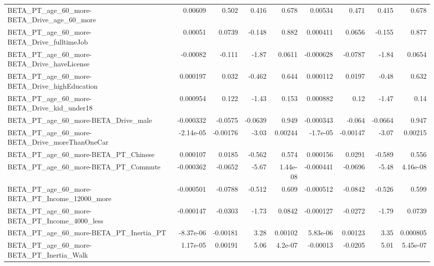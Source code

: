 \begin{tabular}{lrrrrrrrr}
BETA\_PT\_age\_60\_more-BETA\_Drive\_age\_60\_more         &     0.00609 &        0.502 &    0.416 &    0.678 &    0.00534 &       0.471 &        0.415 &         0.678 \\
BETA\_PT\_age\_60\_more-BETA\_Drive\_fulltimeJob         &     0.00051 &       0.0739 &   -0.148 &    0.882 &   0.000411 &      0.0656 &       -0.155 &         0.877 \\
BETA\_PT\_age\_60\_more-BETA\_Drive\_haveLicense         &    -0.00082 &       -0.111 &    -1.87 &   0.0611 &  -0.000628 &     -0.0787 &        -1.84 &        0.0654 \\
BETA\_PT\_age\_60\_more-BETA\_Drive\_highEducation       &    0.000197 &        0.032 &   -0.462 &    0.644 &   0.000112 &      0.0197 &        -0.48 &         0.632 \\
BETA\_PT\_age\_60\_more-BETA\_Drive\_kid\_under18         &    0.000954 &        0.122 &    -1.43 &    0.153 &   0.000882 &        0.12 &        -1.47 &          0.14 \\
BETA\_PT\_age\_60\_more-BETA\_Drive\_male                &   -0.000332 &      -0.0575 &  -0.0639 &    0.949 &  -0.000343 &      -0.064 &      -0.0664 &         0.947 \\
BETA\_PT\_age\_60\_more-BETA\_Drive\_moreThanOneCar      &   -2.14e-05 &     -0.00176 &    -3.03 &  0.00244 &   -1.7e-05 &    -0.00147 &        -3.07 &       0.00215 \\
BETA\_PT\_age\_60\_more-BETA\_PT\_Chinese                &    0.000107 &       0.0185 &   -0.562 &    0.574 &   0.000156 &      0.0291 &       -0.589 &         0.556 \\
BETA\_PT\_age\_60\_more-BETA\_PT\_Commute                &   -0.000362 &      -0.0652 &    -5.67 & 1.44e-08 &  -0.000441 &     -0.0696 &        -5.48 &      4.16e-08 \\
BETA\_PT\_age\_60\_more-BETA\_PT\_Income\_12000\_more      &   -0.000501 &      -0.0788 &   -0.512 &    0.609 &  -0.000512 &     -0.0842 &       -0.526 &         0.599 \\
BETA\_PT\_age\_60\_more-BETA\_PT\_Income\_4000\_less       &   -0.000147 &      -0.0303 &    -1.73 &   0.0842 &  -0.000127 &     -0.0272 &        -1.79 &        0.0739 \\
BETA\_PT\_age\_60\_more-BETA\_PT\_Inertia\_PT             &   -8.37e-06 &     -0.00181 &     3.28 &  0.00102 &   5.83e-06 &     0.00123 &         3.35 &      0.000805 \\
BETA\_PT\_age\_60\_more-BETA\_PT\_Inertia\_Walk           &    1.17e-05 &      0.00191 &     5.06 &  4.2e-07 &   -0.00013 &     -0.0205 &         5.01 &      5.45e-07 \\

\end{tabular}
